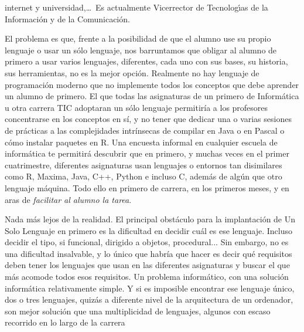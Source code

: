 \documentclass[twoside,10pt]{article}
\begin{document}
\begin{multicols}{2}
{{\begin{window}
		internet y universidad,\ldots\ 
		Es actualmente Vicerrector de Tecnolog\'{\i}as de la Informaci\'{o}n y
de la Comunicaci\'{o}n.   
		\end{window}}}

El problema es que, frente a la posibilidad de que el alumno use su
propio lenguaje o usar un sólo lenguaje, nos barruntamos que obligar
al alumno de primero a usar varios lenguajes, diferentes, cada uno con
sus bases, su historia, sus herramientas, no es la mejor opción. Realmente
no hay lenguaje de programación moderno que no
implemente todos los conceptos que debe aprender un alumno de
primero. El que todas las asignaturas de un primero de Informática u
otra carrera TIC adoptaran un sólo lenguaje permitiría a los profesores
concentrarse en los conceptos en sí, y no tener que dedicar una o
varias sesiones de prácticas a las complejidades intrínsecas de
compilar en Java o en Pascal o cómo instalar paquetes en R. Una
encuesta informal en cualquier escuela de informática te permitirá
descubrir que en primero, y muchas veces en el primer cuatrimestre,
diferentes asignaturas usan lenguajes o entornos tan disimilares como
R, Maxima, Java, C++, Python e incluso C, además de algún
que otro lenguaje máquina. Todo ello en primero de carrera, en los
primeros meses, y en aras de {\em facilitar al alumno la tarea}. 

Nada más lejos de la realidad. El principal obstáculo para la
implantación de Un Solo Lenguaje en primero es la dificultad
en decidir cuál es ese lenguaje. Incluso decidir el tipo, si
funcional, dirigido a objetos, procedural... Sin embargo, no es una
dificultad insalvable, y lo único que habría que hacer es decir qué
requisitos deben tener los lenguajes que usan en las diferentes
asignaturas y buscar el que más acomode todos esos requisitos. Un
problema informático, con una solución informática relativamente
simple. Y si es imposible encontrar ese lenguaje único, dos o tres
lenguajes, quizás a diferente nivel de la arquitectura de un
ordenador, son mejor solución que una multiplicidad de lenguajes,
algunos con escaso recorrido en lo largo de la carrera


\end{multicols}
\end{document}
